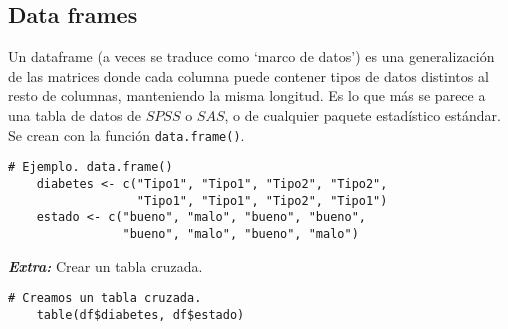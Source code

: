 \documentclass{article}
\begin{document}
	\subsection{Data frames} 	
		Un dataframe (a veces se traduce como ‘marco de datos’) es una generalización
		de las matrices donde cada columna puede contener tipos de datos distintos al
		resto de columnas, manteniendo la misma longitud. Es lo que más se parece a una
		tabla de datos de $SPSS$ o $SAS$, o de cualquier paquete estadístico estándar.
		Se crean con la función \verb|data.frame()|.
		
\begin{lstlisting}
# Ejemplo. data.frame() 
	diabetes <- c("Tipo1", "Tipo1", "Tipo2", "Tipo2",
	              "Tipo1", "Tipo1", "Tipo2", "Tipo1")
	estado <- c("bueno", "malo", "bueno", "bueno",
	            "bueno", "malo", "bueno", "malo")
\end{lstlisting}

		{\bf \it Extra:} Crear un tabla cruzada.
		
\begin{lstlisting}
# Creamos un tabla cruzada.
	table(df$diabetes, df$estado)
\end{lstlisting}		
		
\end{document}
